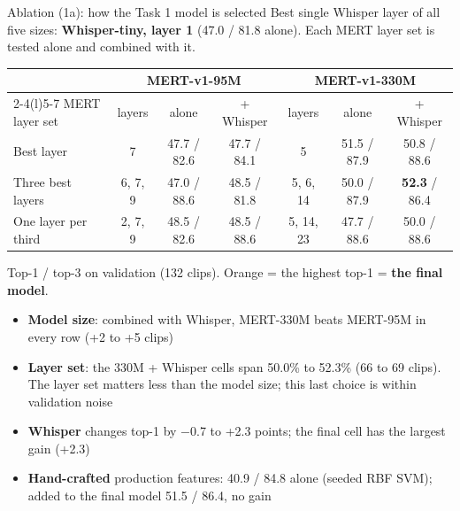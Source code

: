 \documentclass[aspectratio=169,11pt]{beamer}
\newcommand{\best}[1]{\textbf{\alert{#1}}}                       %
\newenvironment{tight}{\begin{itemize}\setlength{\itemsep}{1.5pt}\setlength{\parskip}{0pt}\setlength{\topsep}{0pt}}{\end{itemize}}
\begin{document}
\begin{frame}[t]{Ablation (1a): how the Task 1 model is selected}
  \footnotesize
  Best single Whisper layer of all five sizes: \textbf{Whisper-tiny, layer 1} (47.0 / 81.8 alone). Each MERT layer set is tested alone and combined with it.
  \vspace{0.4em}

  \centering
  {\footnotesize\setlength{\tabcolsep}{4.5pt}
  \begin{tabular}{@{}l ccc ccc@{}}
    \toprule
    & \multicolumn{3}{c}{MERT-v1-95M} & \multicolumn{3}{c}{MERT-v1-330M} \\ \cmidrule(lr){2-4}\cmidrule(l){5-7}
    MERT layer set & layers & alone & + Whisper & layers & alone & + Whisper \\ \midrule
    Best layer & 7 & 47.7 / 82.6 & 47.7 / 84.1 & 5 & 51.5 / 87.9 & 50.8 / 88.6 \\
    Three best layers & 6, 7, 9 & 47.0 / 88.6 & 48.5 / 81.8 & 5, 6, 14 & 50.0 / 87.9 & \best{52.3} / 86.4 \\
    One layer per third & 2, 7, 9 & 48.5 / 82.6 & 48.5 / 88.6 & 5, 14, 23 & 47.7 / 88.6 & 50.0 / 88.6 \\
    \bottomrule
  \end{tabular}}
  \vspace{0.3em}

  \raggedright
  {\scriptsize\color{gray}Top-1 / top-3 on validation (132 clips). Orange = the highest top-1 = \textbf{the final model}.\par}
  \begin{tight}\footnotesize
    \item \textbf{Model size}: combined with Whisper, MERT-330M beats MERT-95M in every row (+2 to +5 clips)
    \item \textbf{Layer set}: the 330M + Whisper cells span 50.0\% to 52.3\% (66 to 69 clips). The layer set matters less than the model size; this last choice is within validation noise
    \item \textbf{Whisper} changes top-1 by $-$0.7 to +2.3 points; the final cell has the largest gain (+2.3)
    \item \textbf{Hand-crafted} production features: 40.9 / 84.8 alone (seeded RBF SVM); added to the final model 51.5 / 86.4, no gain
  \end{tight}
\end{frame}
\end{document}

